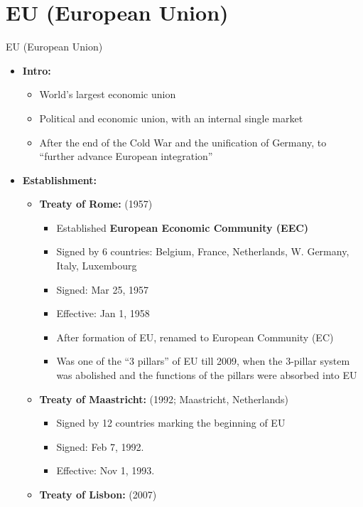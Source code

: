 \documentclass[
  10pt,
  ignorenonframetext,
  progressbar=frametitle]{beamer}
\providecommand{\tightlist}{%
  \setlength{\itemsep}{0pt}\setlength{\parskip}{0pt}}
\begin{document}
\section{EU (European Union)}
\begin{frame}[allowframebreaks]
{EU (European Union)}
\protect\hypertarget{eu-european-union}{}
\begin{itemize}
\tightlist
\item
  \textbf{Intro:}

  \begin{itemize}
  \tightlist
  \item
    World's largest economic union
  \item
    Political and economic union, with an internal single market
  \item
    After the end of the Cold War and the unification of Germany, to
    ``further advance European integration''
  \end{itemize}
\item
  \textbf{Establishment:}

  \begin{itemize}
  \tightlist
  \item
    \textbf{Treaty of Rome:} (1957)

    \begin{itemize}
    \tightlist
    \item
      Established \textbf{European Economic Community (EEC)}
    \item
      Signed by 6 countries: Belgium, France, Netherlands, W. Germany,
      Italy, Luxembourg
    \item
      Signed: Mar 25, 1957
    \item
      Effective: Jan 1, 1958
    \item
      After formation of EU, renamed to European Community (EC)
    \item
      Was one of the ``3 pillars'' of EU till 2009, when the 3-pillar
      system was abolished and the functions of the pillars were
      absorbed into EU
    \end{itemize}
  \item
    \textbf{Treaty of Maastricht:} (1992; Maastricht, Netherlands)

    \begin{itemize}
    \tightlist
    \item
      Signed by 12 countries marking the beginning of EU
    \item
      Signed: Feb 7, 1992.
    \item
      Effective: Nov 1, 1993.
    \end{itemize}
  \item
    \textbf{Treaty of Lisbon:} (2007)


\end{itemize}
\end{itemize}
\end{frame}
\end{document}
